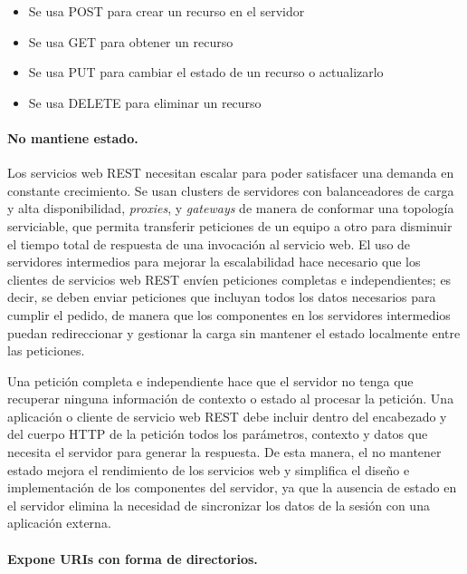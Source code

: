         \begin{itemize}
          \item Se usa POST para crear un recurso en el servidor
          \item Se usa GET para obtener un recurso
          \item Se usa PUT para cambiar el estado de un recurso o actualizarlo
          \item Se usa DELETE para eliminar un recurso 
        \end{itemize}
  
      \paragraph{No mantiene estado.} %
      \label{par:no_mantiene_estado}
        Los servicios web REST necesitan escalar para poder satisfacer una demanda en constante crecimiento. Se usan clusters de servidores con balanceadores de carga y alta disponibilidad, {\it proxies}, y {\it gateways} de manera de conformar una topología serviciable, que permita transferir peticiones de un equipo a otro para disminuir el tiempo total de respuesta de una invocación al servicio web. El uso de servidores intermedios para mejorar la escalabilidad hace necesario que los clientes de servicios web REST envíen peticiones completas e independientes; es decir, se deben enviar peticiones que incluyan todos los datos necesarios para cumplir el pedido, de manera que los componentes en los servidores intermedios puedan redireccionar y gestionar la carga sin mantener el estado localmente entre las peticiones.

        Una petición completa e independiente hace que el servidor no tenga que recuperar ninguna información de contexto o estado al procesar la petición. Una aplicación o cliente de servicio web REST debe incluir dentro del encabezado y del cuerpo HTTP de la petición todos los parámetros, contexto y datos que necesita el servidor para generar la respuesta. De esta manera, el no mantener estado mejora el rendimiento de los servicios web y simplifica el diseño e implementación de los componentes del servidor, ya que la ausencia de estado en el servidor elimina la necesidad de sincronizar los datos de la sesión con una aplicación externa.
      
      \paragraph{Expone URIs con forma de directorios.} %
      \label{par:expone_uris_con_forma_de_directorios}
      
